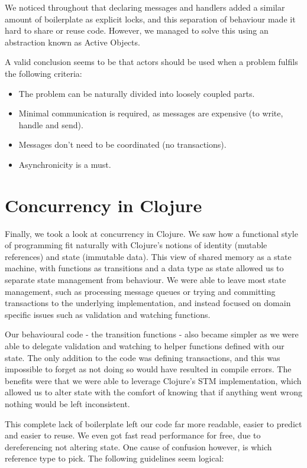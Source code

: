 \documentclass[a4paper,12pt]{kth-mag}
\begin{document}
We noticed throughout that declaring messages and handlers added a similar amount of boilerplate as explicit locks, and this separation of behaviour made it hard to share or reuse code. However, we managed to solve this using an abstraction known as Active Objects.

A valid conclusion seems to be that actors should be used when a problem fulfils the following criteria:

\begin{itemize}
\item The problem can be naturally divided into loosely coupled parts.
\item Minimal communication is required, as messages are expensive (to write, handle and send).
\item Messages don't need to be coordinated (no transactions).
\item Asynchronicity is a must.
\end{itemize}

\section{Concurrency in Clojure}

Finally, we took a look at concurrency in Clojure. We saw how a functional style of programming fit naturally with Clojure's notions of identity (mutable references) and state (immutable data). This view of shared memory as a state machine, with functions as transitions and a data type as state allowed us to separate state management from behaviour. We were able to leave most state management, such as processing message queues or trying and committing transactions to the underlying implementation, and instead focused on domain specific issues such as validation and watching functions.

Our behavioural code - the transition functions - also became simpler as we were able to delegate validation and watching to helper functions defined with our state. The only addition to the code was defining transactions, and this was impossible to forget as not doing so would have resulted in compile errors. The benefits were that we were able to leverage Clojure's STM implementation, which allowed us to alter state with the comfort of knowing that if anything went wrong nothing would be left inconsistent. 

This complete lack of boilerplate left our code far more readable, easier to predict and easier to reuse. We even got fast read performance for free, due to dereferencing not altering state. One cause of confusion however, is which reference type to pick. The following guidelines seem logical:
\end{document}
